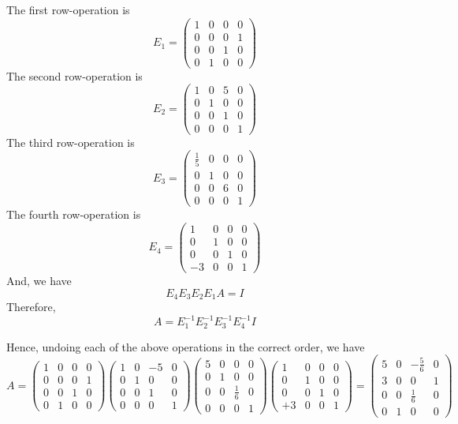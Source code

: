 \documentclass[10pt,twoside]{article}
\begin{document}
The first row-operation is 
\[
E_1 = \begin{pmatrix}
1 & 0 & 0 & 0\\
0 & 0 & 0 & 1\\
0 & 0 & 1 & 0\\
0 & 1 & 0 & 0
\end{pmatrix}\]
The second row-operation is 
\[
E_2 = \begin{pmatrix}
1 & 0 & 5 & 0\\
0 & 1 & 0 & 0\\
0 & 0 & 1 & 0\\
0 & 0 & 0 & 1
\end{pmatrix}\]
The third row-operation is 
\[
E_3 = \begin{pmatrix}
\frac15 & 0 & 0 & 0\\
0 & 1 & 0 & 0\\
0 & 0 & 6 & 0\\
0 & 0 & 0 & 1
\end{pmatrix}\]
The fourth row-operation is 
\[
E_4 = \begin{pmatrix}
1 & 0 & 0 & 0\\
0 & 1 & 0 & 0\\
0 & 0 & 1 & 0\\
-3 & 0 & 0 & 1
\end{pmatrix}\]
And, we have 
\[ E_4E_3E_2E_1 A = I\]
Therefore,
\[ A = E_1^{-1}E_2^{-1}E_3^{-1}E_4^{-1}I \]

Hence, undoing each of the above operations in the correct order, we have
\[
A =
\begin{pmatrix}
1 & 0 & 0 & 0\\
0 & 0 & 0 & 1\\
0 & 0 & 1 & 0\\
0 & 1 & 0 & 0
\end{pmatrix}
\begin{pmatrix}
1 & 0 & -5 & 0\\
0 & 1 & 0 & 0\\
0 & 0 & 1 & 0\\
0 & 0 & 0 & 1
\end{pmatrix}
\begin{pmatrix}
5 & 0 & 0 & 0\\
0 & 1 & 0 & 0\\
0 & 0 & \frac16 & 0\\
0 & 0 & 0 & 1
\end{pmatrix}
\begin{pmatrix}
1 & 0 & 0 & 0\\
0 & 1 & 0 & 0\\
0 & 0 & 1 & 0\\
+3 & 0 & 0 & 1
\end{pmatrix}
=
\begin{pmatrix}
5 & 0 & -\frac56 & 0\\
3 & 0 & 0 & 1\\
0 & 0 & \frac16 & 0\\
0 & 1 & 0 & 0
\end{pmatrix}
\]
\end{document}
